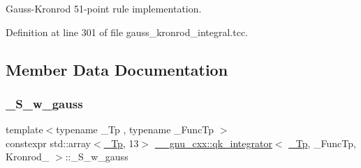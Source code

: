 Gauss-\/\+Kronrod 51-\/point rule implementation. 

Definition at line 301 of file gauss\+\_\+kronrod\+\_\+integral.\+tcc.



\subsection{Member Data Documentation}
\mbox{\label{struct____gnu__cxx_1_1qk__integrator_3_01__Tp_00_01__FuncTp_00_01Kronrod__51_01_4_a46350a2894837e29ffe6b9b3cdf1c0ed}} 
\subsubsection{\texorpdfstring{\+\_\+\+S\+\_\+w\+\_\+gauss}{\_S\_w\_gauss}}
{\footnotesize\ttfamily template$<$typename \+\_\+\+Tp , typename \+\_\+\+Func\+Tp $>$ \\
constexpr std\+::array$<$\hyperlink{namespace____gnu__cxx_a3b19a9c800ca194374ef9172290f7d79}{\+\_\+\+Tp}, 13$>$ \hyperlink{class____gnu__cxx_1_1qk__integrator}{\+\_\+\+\_\+gnu\+\_\+cxx\+::qk\+\_\+integrator}$<$ \hyperlink{namespace____gnu__cxx_a3b19a9c800ca194374ef9172290f7d79}{\+\_\+\+Tp}, \+\_\+\+Func\+Tp, Kronrod\+\_ $>$\+::\+\_\+\+S\+\_\+w\+\_\+gauss\hspace{0.3cm}{\ttfamily [static]}}

